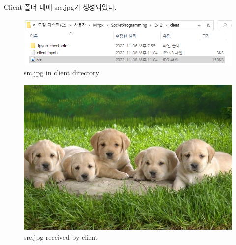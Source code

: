 Client 폴더 내에 src.jpg가 생성되었다. \\
\vspace{-4mm}
\begin{figure}[!h]\centering 
	\includegraphics[width=.99\textwidth]{image/week09/2-2.png}
	\caption{\footnotesize
	src.jpg in client directory}
	\vspace{-10pt}
\end{figure}
\vspace{-4mm}
\begin{figure}[!h]\centering 
	\includegraphics[width=.99\textwidth]{image/week09/2-3.png}
	\caption{\footnotesize
	src.jpg received by client}
	\vspace{-10pt}
\end{figure}

\clearpage